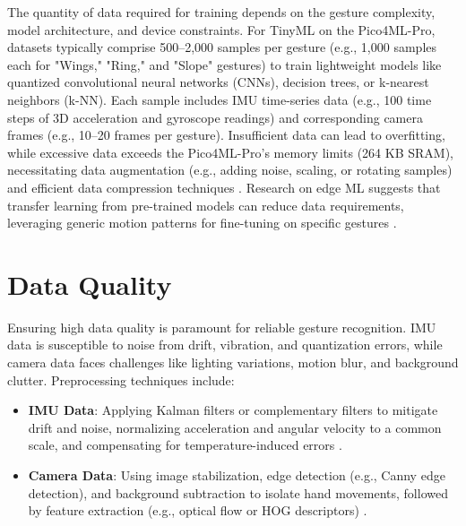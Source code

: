 The quantity of data required for training depends on the gesture complexity, model architecture, and device constraints. For TinyML on the Pico4ML-Pro, datasets typically comprise 500–2,000 samples per gesture (e.g., 1,000 samples each for "Wings," "Ring," and "Slope" gestures) to train lightweight models like quantized convolutional neural networks (CNNs), decision trees, or k-nearest neighbors (k-NN). Each sample includes IMU time-series data (e.g., 100 time steps of 3D acceleration and gyroscope readings) and corresponding camera frames (e.g., 10–20 frames per gesture). Insufficient data can lead to overfitting, while excessive data exceeds the Pico4ML-Pro’s memory limits (264 KB SRAM), necessitating data augmentation (e.g., adding noise, scaling, or rotating samples) and efficient data compression techniques \cite{Sadiq:2022, Li:2020}. Research on edge ML suggests that transfer learning from pre-trained models can reduce data requirements, leveraging generic motion patterns for fine-tuning on specific gestures \cite{Bistrov:2012}.



\section{Data Quality}

Ensuring high data quality is paramount for reliable gesture recognition. IMU data is susceptible to noise from drift, vibration, and quantization errors, while camera data faces challenges like lighting variations, motion blur, and background clutter. Preprocessing techniques include:



\begin{itemize}

	\item \textbf{IMU Data}: Applying Kalman filters or complementary filters to mitigate drift and noise, normalizing acceleration and angular velocity to a common scale, and compensating for temperature-induced errors \cite{Bishop:1995,Bistrov:2012}.

	\item \textbf{Camera Data}: Using image stabilization, edge detection (e.g., Canny edge detection), and background subtraction to isolate hand movements, followed by feature extraction (e.g., optical flow or HOG descriptors) \cite{Garcia:2019}.

\end{itemize}



